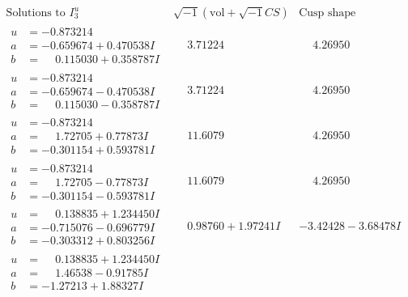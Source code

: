 \documentclass[1p]{elsarticle_modified}
\theoremstyle{definition}
\newcommand{\I}{\sqrt{-1}}
\begin{document}
$$\begin{array}{c|c|c}  
\text{Solutions to }I^u_{3}& \I (\text{vol} + \sqrt{-1}CS) & \text{Cusp shape}\\
 \hline 
\begin{aligned}
u &= -0.873214\phantom{ +0.000000I} \\
a &= -0.659674 + 0.470538 I \\
b &= \phantom{-}0.115030 + 0.358787 I\end{aligned}
 & \phantom{-}3.71224\phantom{ +0.000000I} & \phantom{-}4.26950\phantom{ +0.000000I} \\ \hline\begin{aligned}
u &= -0.873214\phantom{ +0.000000I} \\
a &= -0.659674 - 0.470538 I \\
b &= \phantom{-}0.115030 - 0.358787 I\end{aligned}
 & \phantom{-}3.71224\phantom{ +0.000000I} & \phantom{-}4.26950\phantom{ +0.000000I} \\ \hline\begin{aligned}
u &= -0.873214\phantom{ +0.000000I} \\
a &= \phantom{-}1.72705 + 0.77873 I \\
b &= -0.301154 + 0.593781 I\end{aligned}
 & \phantom{-}11.6079\phantom{ +0.000000I} & \phantom{-}4.26950\phantom{ +0.000000I} \\ \hline\begin{aligned}
u &= -0.873214\phantom{ +0.000000I} \\
a &= \phantom{-}1.72705 - 0.77873 I \\
b &= -0.301154 - 0.593781 I\end{aligned}
 & \phantom{-}11.6079\phantom{ +0.000000I} & \phantom{-}4.26950\phantom{ +0.000000I} \\ \hline\begin{aligned}
u &= \phantom{-}0.138835 + 1.234450 I \\
a &= -0.715076 - 0.696779 I \\
b &= -0.303312 + 0.803256 I\end{aligned}
 & \phantom{-}0.98760 + 1.97241 I & -3.42428 - 3.68478 I \\ \hline\begin{aligned}
u &= \phantom{-}0.138835 + 1.234450 I \\
a &= \phantom{-}1.46538 - 0.91785 I \\
b &= -1.27213 + 1.88327 I\end{aligned}

\end{array}$$
\end{document}

